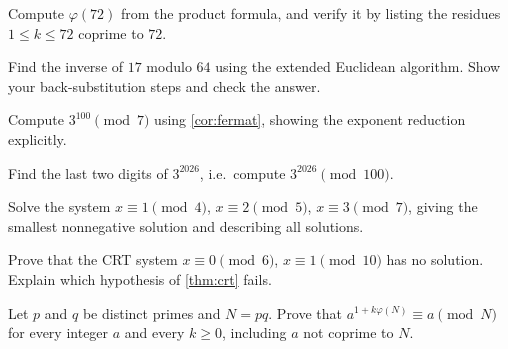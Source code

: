 
\begin{exercise}\label{ex:nt-1}
Compute $\varphi(72)$ from the product formula, and verify it by listing
the residues $1 \le k \le 72$ coprime to $72$.
\end{exercise}

\begin{exercise}\label{ex:nt-2}
Find the inverse of $17$ modulo $64$ using the extended Euclidean
algorithm. Show your back-substitution steps and check the answer.
\end{exercise}

\begin{exercise}\label{ex:nt-3}
Compute $3^{100} \pmod{7}$ using \cref{cor:fermat}, showing the
exponent reduction explicitly.
\end{exercise}

\begin{exercise}\label{ex:nt-4}
Find the last two digits of $3^{2026}$, i.e.\ compute $3^{2026} \pmod{100}$.
\end{exercise}

\begin{exercise}\label{ex:nt-5}
Solve the system $x \equiv 1 \pmod{4}$, $x \equiv 2 \pmod{5}$,
$x \equiv 3 \pmod{7}$, giving the smallest nonnegative solution and
describing all solutions.
\end{exercise}

\begin{exercise}\label{ex:nt-6}
Prove that the CRT system $x \equiv 0 \pmod{6}$, $x \equiv 1 \pmod{10}$
has no solution. Explain which hypothesis of \cref{thm:crt} fails.
\end{exercise}

\begin{exercise}\label{ex:nt-7}
Let $p$ and $q$ be distinct primes and $N = pq$. Prove that
$a^{1 + k\varphi(N)} \equiv a \pmod{N}$ for every integer $a$ and every
$k \ge 0$, including $a$ not coprime to $N$.
\end{exercise}
